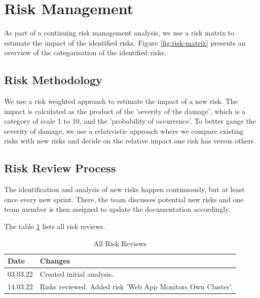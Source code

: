 \section{Risk Management}

As part of a continuing risk management analysis, we use a risk matrix to estimate the impact of the identified risks.\newline
Figure \ref{fig:risk-matrix} presents an overview of the categorisation of the identified risks.

\subsection{Risk Methodology}
We use a risk weighted approach to estimate the impact of a new risk. The impact is calculated as the product of the 'severity of the damage', which is a category of scale 1 to 10, and the 'probability of occurrence'. To better gauge the severity of damage, we use a relativistic approach where we compare existing risks with new risks and decide on the relative impact one risk has versus others.

\subsection{Risk Review Process}
The identification and analysis of new risks happen continuously, but at least once every new sprint. There, the team discusses potential new risks and one team member is then assigned to update the documentation accordingly.

The table \ref{tab:risk-review} lists all risk reviews.

\begin{table}[h!]
\centering
  \caption{\label{tab:risk-review}All Risk Reviews}
  \begin{tabular}{ | l | l | }
    \hline
    \textbf{Date} & \textbf{Changes} \\
    \hline
    03.03.22 & Created initial analysis. \\
    \hline
    14.03.22 & Risks reviewed. Added risk 'Web App Monitors Own Cluster'. \\
    \hline
  \end{tabular}
\end{table}

